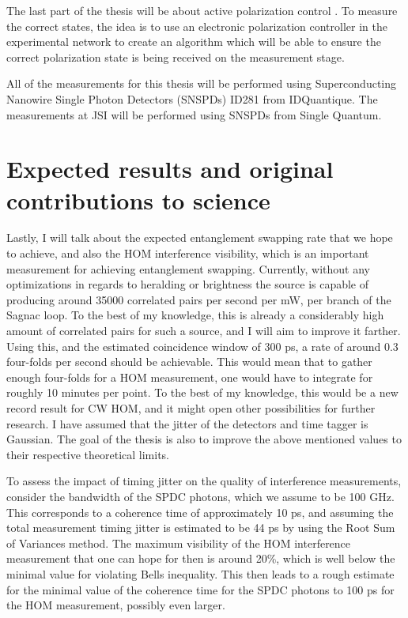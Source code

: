 \documentclass{article}
\begin{document}
The last part of the thesis will be about active polarization control
\cite{CCSHDCDRS}. To measure the correct states, the
idea is to use an electronic polarization controller in the experimental network to create an algorithm which will be able to
ensure the correct polarization state is being received on the measurement stage.

All of the measurements for this thesis will be performed using Superconducting Nanowire Single Photon Detectors (SNSPDs) ID281 from IDQuantique. The
measurements at JSI will be performed using SNSPDs from Single Quantum.


\section{Expected results and original contributions to science}
Lastly, I will talk about the expected entanglement swapping rate that we hope to achieve, and also the HOM interference visibility, which
is an important measurement for achieving entanglement swapping. Currently, without any optimizations in regards to heralding
or brightness the source is capable of producing around 35000 correlated pairs per second per mW, per branch of the Sagnac loop.
To the best of my knowledge, this is already a considerably high amount of correlated pairs for such a source, and I will aim to improve it
farther. Using this, and the estimated coincidence window of 300 ps, a rate of around 0.3 four-folds per second should be achievable.
This would mean that to gather enough four-folds for a HOM measurement, one would have to integrate for roughly 10 minutes per point.
To the best of my knowledge, this would be a new record result for CW HOM, and it might open other possibilities for further research.
I have assumed that the jitter of the detectors and time tagger is Gaussian. The goal of the thesis is also to improve the above mentioned
values to their respective theoretical limits.
\par To assess the impact of timing jitter on the quality of interference measurements, consider the bandwidth of the SPDC photons, which we assume
to be 100 GHz. This corresponds to a coherence time of approximately 10 ps, and assuming the total measurement timing jitter is estimated
to be 44 ps by using the Root Sum of Variances method.
The maximum visibility of the HOM interference measurement that one can hope for then is around 20\%, which is well below the minimal value for violating
Bells inequality.
This then leads to a rough estimate for the minimal value of the coherence time for the SPDC photons to 100 ps for the HOM measurement, possibly even larger.
\end{document}

